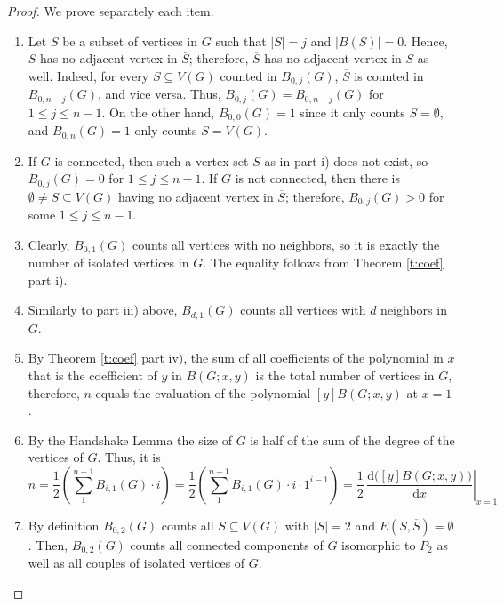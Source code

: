 \documentclass[review]{elsarticle}
\begin{document}
\begin{proof}
We prove separately each item.

\begin{enumerate}[$i)$]
  \item {Let $S$ be a subset of vertices in $G$ such that $|S| = j$ and $|B(S)| = 0$. Hence, $S$ has no adjacent vertex in $\overline{S}$; therefore, $\overline{S}$ has no adjacent vertex in $S$ as well. Indeed, for every $S\subseteq V(G)$ counted in $B_{0,j}(G)$, $\overline{S}$ is counted in $B_{0,n-j}(G)$, and vice versa. Thus, $B_{0,j}(G) = B_{0,n-j}(G)$ for $1 \leq j \leq n-1$. On the other hand, $B_{0,0}(G) = 1$ since it only counts $S=\emptyset$, and $B_{0,n}(G)=1$ only counts $S=V(G)$.
  }

  \item {If $G$ is connected, then such a vertex set $S$ as in part i) does not exist, so $B_{0,j}(G) = 0$ for $1 \leq j \leq n-1$. If $G$ is not connected, then there is $\emptyset\neq S\subseteq V(G)$ having no adjacent vertex in $\overline{S}$; therefore, $B_{0,j}(G) > 0$ for some $1 \leq j \leq n-1$.}

  \item {Clearly, $B_{0,1}(G)$ counts all vertices with no neighbors, so it is exactly the number of isolated vertices in $G$. The equality follows from Theorem \ref{t:coef} part i).}

  \item {Similarly to part iii) above, $B_{d,1}(G)$ counts all vertices with $d$ neighbors in $G$.}

  \item {By Theorem \ref{t:coef} part iv), the sum of all coefficients of the polynomial in $x$ that is the coefficient of $y$ in $B(G;x,y)$ is the total number of vertices in $G$, therefore, $n$ equals the evaluation of the polynomial $[y]B(G;x,y)$ at $x=1$.}

  \item {By the Handshake Lemma the size of $G$ is half of the sum of the degree of the vertices of $G$. Thus, it is 
  \[
    n=\displaystyle\frac12\left(\sum_{1}^{n-1} B_{i,1}(G)\cdot i\right)=\frac12\left(\sum_{1}^{n-1} B_{i,1}(G)\cdot i\cdot1^{i-1}\right)=\frac12\,\left.\frac{\text{d}\big([y]B(G;x,y)\big)}{\text{d}x}\right|_{x=1}
  \]
  }

  \item {By definition $B_{0,2}(G)$ counts all $S\subseteq V(G)$ with $|S|=2$ and $E(S,\overline{S})=\emptyset$. Then, $B_{0,2}(G)$ counts all connected components of $G$ isomorphic to $P_2$ as well as all couples of isolated vertices of $G$.}


\end{enumerate}
\end{proof}
\end{document}
